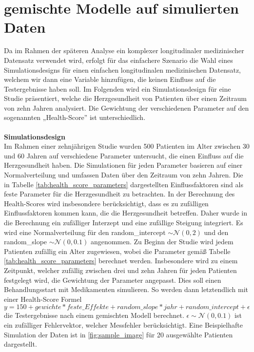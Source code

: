 \documentclass[%
thesis=student,%
coverpage=false,%
titlepage=false,%
headmarks=true, %
german,%
font=libertine, %
math=newpxtx, %
BCOR=5mm,%
coverBCOR=11mm%
]{tumbook}
\theoremstyle{break}
\begin{document}
\section{gemischte Modelle auf simulierten Daten}
Da im Rahmen der späteren Analyse ein komplexer longitudinaler medizinischer Datensatz verwendet wird, erfolgt für das einfachere Szenario die Wahl eines Simulationsdesigns für einen einfachen longitudinalen medizinischen Datensatz, welchem wir dann eine Variable hinzufügen, die keinen Einfluss auf die Testergebnisse haben soll. Im Folgenden wird ein Simulationsdesign für eine Studie präsentiert, welche die Herzgesundheit von Patienten über einen Zeitraum von zehn Jahren analysiert. Die Gewichtung der verschiedenen Parameter auf den sogenannten „Health-Score” ist unterschiedlich.\\
\\
\textbf{Simulationsdesign}\\
Im Rahmen einer zehnjährigen Studie wurden 500 Patienten im Alter zwischen 30 und 60 Jahren auf verschiedene Parameter untersucht, die einen Einfluss auf die Herzgesundheit haben. Die Simulationen für jeden Parameter basieren auf einer Normalverteilung und umfassen Daten über den Zeitraum von zehn Jahren. Die in Tabelle \ref{tab:health_score_parameters} dargestellten Einflussfaktoren sind als feste Parameter für die Herzgesundheit zu betrachten. In der Berechnung des Health-Scores wird insbesondere berücksichtigt, dass es zu zufälligen Einflussfaktoren kommen kann, die die Herzgesundheit betreffen. Daher wurde in die Berechnung ein zufälliger Interzept und eine zufällige Steigung integriert. Es wird eine Normalverteilung für den random\_intercept $\sim \mathcal{N}(0,2)$ und den random\_slope $\sim \mathcal{N}(0,0.1)$ angenommen. Zu Beginn der Studie wird jedem Patienten zufällig ein Alter zugewiesen, wobei die Parameter gemäß Tabelle \ref{tab:health_score_parameters} berechnet werden. Insbesondere wird zu einem Zeitpunkt, welcher zufällig zwischen drei und zehn Jahren für jeden Patienten festgelegt wird, die Gewichtung der Parameter angepasst. Dies soll einen Behandlungsstart mit Medikamenten simulieren. So werden dann letztendlich mit einer Health-Score Formel $$ y = 150 +  gewichte * feste\_Effekte + random\_slope * jahr + random\_intercept + \epsilon $$ die Testergebnisse nach einem gemischten Modell berechnet. $\epsilon \sim \mathcal{N}(0,0.1)$ ist ein zufälliger Fehlervektor, welcher Messfehler berücksichtigt. Eine Beispielhafte Simulation der Daten ist in \ref{fig:sample_image} für 20 ausgewählte Patienten dargestellt. \\
\end{document}
